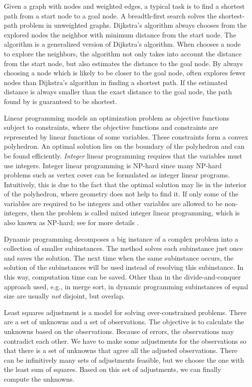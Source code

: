 Given a graph with nodes and weighted edges,
a typical task is to find a shortest path 
from a start node to a goal node.
A breadth-first search \parencite[chapter~22]{Cormen2009}
solves the shortest-path problem 
in unweighted graphs.
Dijkstra's algorithm \parencite{Dijkstra1959}
always chooses 
from the explored nodes the neighbor 
with minimum distance from the start node. 
The \Astar algorithm is 
a generalized version of Dijkstra's algorithm.
When \Astar chooses a node to explore the neighbors,
the algorithm not only takes into account 
the distance from the start node,
but also estimates the distance to the goal node.
By always choosing a node which is likely 
to be closer to the goal node, 
\Astar often explores fewer nodes than Dijkstra's algorithm
in finding a shortest path.
If the estimated distance is always smaller than the exact 
distance to the goal node, 
the path found by \Astar is guaranteed to be shortest.

Linear programming models an optimization problem as objective 
functions subject to constraints,
where the objective functions and constraints are represented by 
linear functions of some variables.
These constraints form a convex polyhedron.
An optimal solution lies on the boundary of the polyhedron and 
can be found efficiently.
\emph{Integer} linear programming requires that
the variables must use integers.
Integer linear programming is NP-hard
since many NP-hard problems such as vertex cover can be 
formulated as integer linear programs.
Intuitively, this is due to the fact that the optimal solution 
may lie in the interior of the polyhedron, where geometry does 
not help to find it.
If only some of the variables are required to be integers
and other variables are allowed to be non-integers, 
then the problem is called mixed integer linear programming,
which is also known as NP-hard; see for more details
\textcite[chapter~16]{Schrijver1986}.



Dynamic programming decomposes 
a big instance of a complex problem 
into a collection of smaller subinstances.
The method solves each subinstance just once and saves the 
solution. 
The next time when the same subinstance occurs, the solution of 
the subinstances will be used instead of resolving this 
subinstance. 
In this way, computation time can be saved.
Other than in the divide-and-conquer approach used, 
e.g., in merge sort, 
in dynamic programming subinstances of equal size 
are usually \emph{not} disjoint, but overlap.

Least squares adjustment is a model for solving 
over-constrained problems.  
There are a set of unknowns and a set of observations.
The objective is to calculate the unknowns based on the 
observations.
Because of errors, the observations may contradict each other.
We have to make some adjustments for the 
observations so that there is a set of unknowns that agree 
all the adjusted observations.
There can be infinitively many sets of adjustments feasible, 
but we choose the one with the least sum of squares.
Based on this set of adjustments,
we can finally compute the unknowns.



